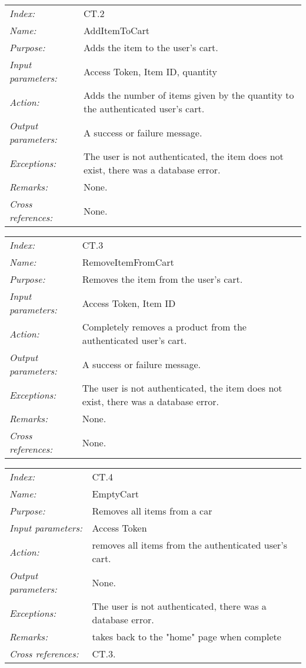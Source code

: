 \documentclass[10pt,letter]{article}
\begin{document}
\begin{tabularx}{\textwidth}{l X}
    \it{Index:} & CT.2 \\
    \it{Name:} & AddItemToCart \\
    \it{Purpose:} & Adds the item to the user's cart. \\
    \it{Input parameters:} & Access Token, Item ID, quantity \\
    \it{Action:} & Adds the number of items given by the quantity to the authenticated user's cart. \\
    \it{Output parameters:} & A success or failure message. \\
    \it{Exceptions:} & The user is not authenticated, the item does not exist, there was a database error. \\
    \it{Remarks:} & None. \\
    \it{Cross references:} & None. \\
    \hline
\end{tabularx}

\begin{tabularx}{\textwidth}{l X}
    \it{Index:} & CT.3 \\
    \it{Name:} & RemoveItemFromCart \\
    \it{Purpose:} & Removes the item from the user's cart. \\
    \it{Input parameters:} & Access Token, Item ID \\
    \it{Action:} & Completely removes a product from the authenticated user's cart. \\
    \it{Output parameters:} & A success or failure message. \\
    \it{Exceptions:} & The user is not authenticated, the item does not exist, there was a database error. \\
    \it{Remarks:} & None. \\
    \it{Cross references:} & None. \\
    \hline
\end{tabularx}

\begin{tabularx}{\textwidth}{l X}
    \it{Index:} & CT.4 \\
    \it{Name:} & EmptyCart \\
    \it{Purpose:} & Removes all items from a car \\
    \it{Input parameters:} & Access Token \\
    \it{Action:} & removes all items from the authenticated user's cart. \\
    \it{Output parameters:} & None. \\
    \it{Exceptions:} & The user is not authenticated, there was a database error. \\
    \it{Remarks:} & takes back to the "home" page when complete \\
    \it{Cross references:} & CT.3. \\
    \hline
\end{tabularx}
\end{document}
